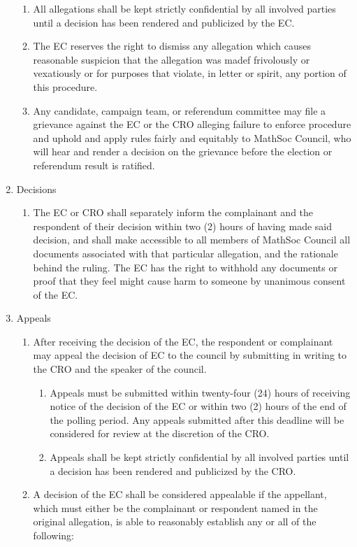 \begin{enumerate}
\begin{enumerate}
        \item All allegations shall be kept strictly confidential by all involved parties until a decision has been rendered and publicized by the EC.
        \item The EC reserves the right to dismiss any allegation which causes reasonable suspicion that the allegation was madef frivolously or vexatiously or for purposes that violate, in letter or spirit, any portion of this procedure.
        \item Any candidate, campaign team, or referendum committee may file a grievance against the EC or the CRO alleging failure to enforce procedure and uphold and apply rules fairly and equitably to MathSoc Council, who will hear and render a decision on the grievance before the election or referendum result is ratified.
    \end{enumerate}
    \item Decisions 
    \begin{enumerate}
    \item The EC or CRO shall separately inform the complainant and the respondent of their decision within two (2) hours of having made said decision, and shall make accessible to all members of MathSoc Council all documents associated with that particular allegation, and the rationale behind the ruling. The EC has the right to withhold any documents or proof that they feel might cause harm to someone by unanimous consent of the EC.
    \end{enumerate}
    \item Appeals 
    \begin{enumerate}
        \item After receiving the decision of the EC, the respondent or complainant may appeal the decision of EC to the council by submitting in writing to the CRO and the speaker of the council.
        \begin{enumerate}
            \item Appeals must be submitted within twenty-four (24) hours of receiving notice of the decision of the EC or within two (2) hours of the end of the polling period. Any appeals submitted after this deadline will be considered for review at the discretion of the CRO.
            \item Appeals shall be kept strictly confidential by all involved parties until a decision has been rendered and publicized by the CRO.
        \end{enumerate}
        \item A decision of the EC shall be considered appealable if the appellant, which must either be the complainant or respondent named in the original allegation, is able to reasonably establish any or all of the following:

\end{enumerate}
\end{enumerate}
